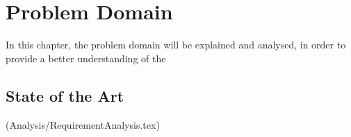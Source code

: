 \chapter{Problem Domain}\label{part:analysis}

In this chapter, the problem domain will be explained and analysed, in order to provide a better understanding of the 

\section{State of the Art}



(Analysis/RequirementAnalysis.tex)





